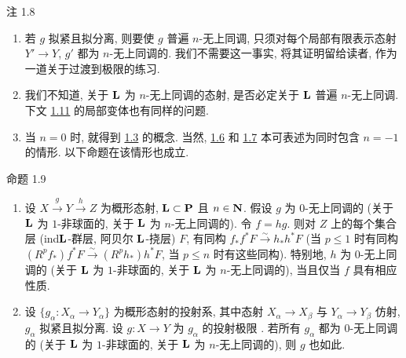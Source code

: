 \begin{enonce*}[remark]{注 1.8}
\begin{enumerate}
\renewcommand{\theenumi}{\alph{enumi}}
\renewcommand{\labelenumi}{\theenumi)}
\item 若 $g$ 拟紧且拟分离, 则要使 $g$ 普遍 $n$-无上同调, 只须对每个局部有限表示态射 $Y'\rightarrow Y$, $g'$ 都为 $n$-无上同调的. 我们不需要这一事实, 将其证明留给读者, 作为一道关于过渡到极限的练习.

\item 我们不知道, 关于 $\mathbf{L}$ 为 $n$-无上同调的态射, 是否必定关于 $\mathbf{L}$ 普遍 $n$-无上同调. 下文 \hyperref[XV.def1.11]{1.11} 的局部变体也有同样的问题.

\item 当 $n=0$ 时, 就得到 \hyperref[XV.def1.3]{1.3} 的概念. 当然, \hyperref[XV.prop1.6]{1.6} 和 \hyperref[XV.def1.7]{1.7} 本可表述为同时包含 $n=-1$ 的情形. 以下命题在该情形也成立.\pageoriginale
\end{enumerate}
\end{enonce*}

\begin{enonce*}{命题 1.9}
\begin{enumerate}
\renewcommand{\theenumi}{\roman{enumi}}
\renewcommand{\labelenumi}{(\theenumi)}
\item 设 $X\xrightarrow{g}Y\xrightarrow{h}Z$ 为概形态射, $\mathbf{L}\subset\mathbf{P}$ 且 $n\in\mathbf{N}$. 假设 $g$ 为 $0$-无上同调的 (\resp 关于 $\mathbf{L}$ 为 $1$-非球面的, \resp 关于 $\mathbf{L}$ 为 $n$-无上同调的). 令 $f=hg$. 则对 $Z$ 上的每个集合层 (\resp ind\sisi{-}{ }$\mathbf{L}$-群层, \resp 阿贝尔 $\mathbf{L}$-挠层) $F$, 有同构 $f_{\ast}f^{\ast}F\xrightarrow{\sim}h_{\ast}h^{\ast}F$ (\resp 当 $p\leq1$ 时有同构 $(R^{p}f_{\ast})f^{\ast}F\xrightarrow{\sim}
  (R^{p}h_{\ast})h^{\ast}F$, \resp 当 $p\leq n$ 时有这些同构). 特别地, $h$ 为 $0$-无上同调的 (\resp 关于 $\mathbf{L}$ 为 $1$-非球面的, \resp 关于 $\mathbf{L}$ 为 $n$-无上同调的), 当且仅当 $f$ 具有相应性质.

\item 设 $\{g_{\alpha}:X_{\alpha}\rightarrow Y_{\alpha}\}$ 为概形态射的投射系, 其中态射 $X_{\alpha}\rightarrow X_{\beta}$ 与 $Y_{\alpha}\rightarrow Y_{\beta}$ 仿射, $g_{\alpha}$ 拟紧且拟分离. 设 $g:X\rightarrow Y$ 为 $g_{\alpha}$ 的投射极限 . 若所有 $g_{\alpha}$ 都为 $0$-无上同调的 (\resp 关于 $\mathbf{L}$ 为 $1$-非球面的, \resp 关于 $\mathbf{L}$ 为 $n$-无上同调的), 则 $g$ 也如此.
\end{enumerate}
\end{enonce*}

